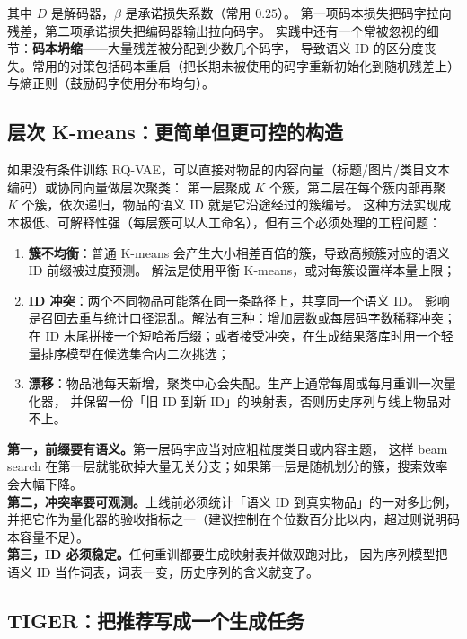 其中 $D$ 是解码器，$\beta$ 是承诺损失系数（常用 $0.25$）。
第一项码本损失把码字拉向残差，第二项承诺损失把编码器输出拉向码字。
实践中还有一个常被忽视的细节：\textbf{码本坍缩}——大量残差被分配到少数几个码字，
导致语义 ID 的区分度丧失。常用的对策包括码本重启（把长期未被使用的码字重新初始化到随机残差上）
与熵正则（鼓励码字使用分布均匀）。

\subsection{层次 K-means：更简单但更可控的构造}

如果没有条件训练 RQ-VAE，可以直接对物品的内容向量（标题/图片/类目文本编码）或协同向量做层次聚类：
第一层聚成 $K$ 个簇，第二层在每个簇内部再聚 $K$ 个簇，依次递归，物品的语义 ID 就是它沿途经过的簇编号。
这种方法实现成本极低、可解释性强（每层簇可以人工命名），但有三个必须处理的工程问题：

\begin{enumerate}
  \item \textbf{簇不均衡}：普通 K-means 会产生大小相差百倍的簇，导致高频簇对应的语义 ID 前缀被过度预测。
        解法是使用平衡 K-means，或对每簇设置样本量上限；
  \item \textbf{ID 冲突}：两个不同物品可能落在同一条路径上，共享同一个语义 ID。
        影响是召回去重与统计口径混乱。解法有三种：增加层数或每层码字数稀释冲突；
        在 ID 末尾拼接一个短哈希后缀；或者接受冲突，在生成结果落库时用一个轻量排序模型在候选集合内二次挑选；
  \item \textbf{漂移}：物品池每天新增，聚类中心会失配。生产上通常每周或每月重训一次量化器，
        并保留一份「旧 ID 到新 ID」的映射表，否则历史序列与线上物品对不上。
\end{enumerate}

\begin{keypoint}[语义 ID 的三条设计原则]
\textbf{第一，前缀要有语义。}第一层码字应当对应粗粒度类目或内容主题，
这样 beam search 在第一层就能砍掉大量无关分支；如果第一层是随机划分的簇，搜索效率会大幅下降。\\
\textbf{第二，冲突率要可观测。}上线前必须统计「语义 ID 到真实物品」的一对多比例，
并把它作为量化器的验收指标之一（建议控制在个位数百分比以内，超过则说明码本容量不足）。\\
\textbf{第三，ID 必须稳定。}任何重训都要生成映射表并做双跑对比，
因为序列模型把语义 ID 当作词表，词表一变，历史序列的含义就变了。
\end{keypoint}

\subsection{TIGER：把推荐写成一个生成任务}


